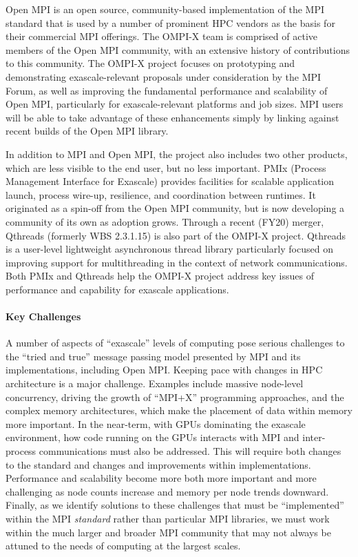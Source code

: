Open MPI is an open source, community-based implementation of the MPI
standard that is used by a number of prominent
HPC vendors as the basis for their commercial MPI offerings.   The
OMPI-X team is comprised of active members of the Open MPI community,
with an extensive history of contributions to this community.
The OMPI-X project focuses on prototyping
and demonstrating exascale-relevant proposals under consideration by
the MPI Forum, as well as improving the fundamental performance and
scalability of Open MPI, particularly for exascale-relevant platforms
and job sizes.  
MPI users will be able to take advantage of these
enhancements simply by linking against recent builds of the Open MPI
library.

In addition to MPI and Open MPI, the project also includes two other products, 
which are less visible to the end user, but no less important.  
PMIx (Process Management Interface for Exascale) provides facilities for 
scalable application launch, process wire-up, resilience, and coordination between runtimes.  
It originated as a spin-off from the Open MPI community, but is now developing a 
community of its own as adoption grows.  Through a recent (FY20) merger, 
Qthreads (formerly WBS 2.3.1.15) is also part of the OMPI-X project.  Qthreads is a 
user-level lightweight asynchronous thread library particularly focused on improving support for 
multithreading in the context of network communications.  Both PMIx and Qthreads help the 
OMPI-X project address key issues of performance and capability for exascale applications.


\paragraph{Key  Challenges}
A number of aspects of ``exascale'' levels
of computing pose serious challenges to the ``tried and true'' message
passing model presented by MPI and its implementations, including Open
MPI.
%
Keeping pace with changes in HPC architecture is a major challenge.
Examples include massive node-level concurrency, driving the 
growth of ``MPI+X'' programming approaches, 
and the complex memory architectures, which make the placement of data 
within memory more important. In the near-term, with GPUs dominating the exascale 
environment, how code running on the GPUs interacts with MPI and inter-process 
communications must also be addressed.  This will require both changes to the standard 
and changes and improvements within implementations.
%
Performance and scalability become more both more important and more 
challenging as node counts increase
and memory per node trends downward.
%
Finally, as we identify solutions to these challenges that must be
``implemented'' within the MPI \emph{standard} rather than particular MPI libraries,
we must work within the much larger and broader MPI
community that may not always be attuned to the needs of computing at the largest scales.

